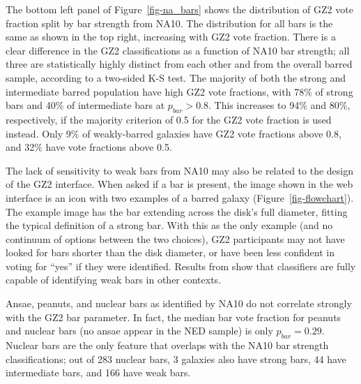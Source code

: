 \documentclass[useAMS,usenatbib]{mn2e}
\providecommand{\DIFaddtex}[1]{{\protect\color{blue}\uwave{#1}}} %
\providecommand{\DIFdeltex}[1]{{\protect\color{red}\sout{#1}}}                      %
\providecommand{\DIFaddbegin}{} %
\providecommand{\DIFaddend}{} %
\providecommand{\DIFdelbegin}{} %
\providecommand{\DIFdelend}{} %
\providecommand{\DIFadd}[1]{\texorpdfstring{\DIFaddtex{#1}}{#1}} %
\providecommand{\DIFdel}[1]{\texorpdfstring{\DIFdeltex{#1}}{}} %
\begin{document}


The bottom left panel of Figure~\ref{fig-na_bars} shows the distribution of GZ2 vote fraction split by bar strength from NA10. The distribution for all bars is the same as shown in the top right, increasing with GZ2 vote fraction. There is a clear difference in the GZ2 classifications as a function of NA10 bar strength; all three are statistically highly distinct from each other and from the overall barred sample, according to a two-sided K-S test. The majority of both the strong and intermediate barred population have high GZ2 vote fractions, with 78\% of strong bars and 40\% of intermediate bars at \DIFdelbegin \DIFdel{$p_{bar}>0.8$}\DIFdelend \DIFaddbegin \DIFadd{$p_\mathrm{bar}>0.8$}\DIFaddend . This increases to 94\% and 80\%, respectively, if the majority criterion of 0.5 \citep{mas11c} for the GZ2 vote fraction is used instead. Only 9\% of weakly-barred galaxies have GZ2 vote fractions above 0.8, and 32\% have vote fractions above 0.5. 

The lack of sensitivity to weak bars from NA10 may also be related to the design of the GZ2 interface. When asked if a bar is present, the image shown in the web interface is an icon with two examples of a barred galaxy (Figure~\ref{fig-flowchart}). The example image has the bar extending across the disk's full diameter, fitting the typical definition of a strong bar. With this as the only example (and no continuum of options between the two choices), GZ2 participants may not have looked for bars shorter than the disk diameter, or have been less confident in voting for ``yes'' if they were identified. Results from \citet{hoy11} show that classifiers are fully capable of identifying weak bars in other contexts.

Ansae, peanuts, and nuclear bars as identified by NA10 do not correlate strongly with the GZ2 bar parameter. In fact, the median bar vote fraction for peanuts and nuclear bars (no ansae appear in the NED sample) is only \DIFdelbegin \DIFdel{$p_{bar}=0.29$}\DIFdelend \DIFaddbegin \DIFadd{$p_\mathrm{bar}=0.29$}\DIFaddend . Nuclear bars are the only feature that overlaps with the NA10 bar strength classifications; out of 283 nuclear bars, 3 galaxies also have strong bars, 44 have intermediate bars, and 166 have weak bars.
\end{document}
